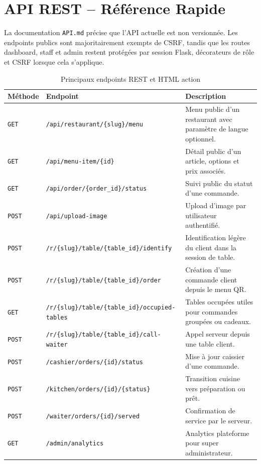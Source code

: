 \documentclass[12pt,a4paper]{report}
\newcommand{\resourcepath}[1]{\texttt{\footnotesize #1}}
\begin{document}
\chapter{API REST -- Référence Rapide}

La documentation \resourcepath{API.md} précise que l'API actuelle est non versionnée. Les endpoints publics sont majoritairement exempts de CSRF, tandis que les routes dashboard, staff et admin restent protégées par session Flask, décorateurs de rôle et CSRF lorsque cela s'applique.

\begin{table}[H]
    \centering
    \begin{tabularx}{\textwidth}{>{\RaggedRight\arraybackslash}p{2cm} >{\RaggedRight\arraybackslash}p{5.1cm} X}
        \toprule
        \rowcolor{primary!10}
        \textbf{Méthode} & \textbf{Endpoint} & \textbf{Description} \\
        \midrule
        \texttt{GET} & \texttt{/api/restaurant/\{slug\}/menu} & Menu public d'un restaurant avec paramètre de langue optionnel. \\
        \texttt{GET} & \texttt{/api/menu-item/\{id\}} & Détail public d'un article, options et prix associés. \\
        \texttt{GET} & \texttt{/api/order/\{order\_id\}/status} & Suivi public du statut d'une commande. \\
        \texttt{POST} & \texttt{/api/upload-image} & Upload d'image par utilisateur authentifié. \\
        \texttt{POST} & \texttt{/r/\{slug\}/table/\{table\_id\}/identify} & Identification légère du client dans la session de table. \\
        \texttt{POST} & \texttt{/r/\{slug\}/table/\{table\_id\}/order} & Création d'une commande client depuis le menu QR. \\
        \texttt{GET} & \texttt{/r/\{slug\}/table/\{table\_id\}/occupied-tables} & Tables occupées utiles pour commandes groupées ou cadeaux. \\
        \texttt{POST} & \texttt{/r/\{slug\}/table/\{table\_id\}/call-waiter} & Appel serveur depuis une table client. \\
        \texttt{POST} & \texttt{/cashier/orders/\{id\}/status} & Mise à jour caissier d'une commande. \\
        \texttt{POST} & \texttt{/kitchen/orders/\{id\}/\{status\}} & Transition cuisine vers préparation ou prêt. \\
        \texttt{POST} & \texttt{/waiter/orders/\{id\}/served} & Confirmation de service par le serveur. \\
        \texttt{GET} & \texttt{/admin/analytics} & Analytics plateforme pour super administrateur. \\
        \bottomrule
    \end{tabularx}
    \caption{Principaux endpoints REST et HTML action}
    \label{tab:api}
\end{table}
\end{document}
